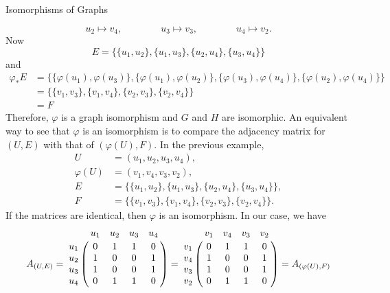 \documentclass[smaller,hyperref={CJKbookmarks=true}]{beamer}
\begin{document}
\begin{frame}{Isomorphisms of Graphs}
\begin{spacing}{1.05}
\[u_2\mapsto v_4,\qquad\qquad u_3\mapsto v_3,\qquad\qquad u_4\mapsto v_2.\]
Now
\[E=\big\{\{u_1,u_2\},\{u_1,u_3\},\{u_2,u_4\},\{u_3,u_4\}\big\}\]
and
\begin{equation*}
  \begin{split}
     \varphi_\ast E &=\big\{\{\varphi(u_1),\varphi(u_3)\},\{\varphi(u_1),\varphi(u_2)\},\{\varphi(u_3),\varphi(u_4)\},\{\varphi(u_2),\varphi(u_4)\}\big\} \\
       &=\big\{\{v_1,v_3\},\{v_1,v_4\},\{v_2,v_3\},\{v_2,v_4\}\big\} \\
       &=F
  \end{split}
\end{equation*}
Therefore, $\varphi$ is a graph isomorphism and $G$ and $H$ are isomorphic.
\newpage
An equivalent way to see that $\varphi$ is an isomorphism is to compare the adjacency matrix for $(U,E)$ with that of $(\varphi(U),F)$. In the previous example,
\begin{align*}
  U &=(u_1,u_2,u_3,u_4), \\
  \varphi(U) &=(v_1,v_4,v_3,v_2), \\
  E &=\big\{\{u_1,u_2\},\{u_1,u_3\},\{u_2,u_4\},\{u_3,u_4\}\big\}, \\
  F &=\big\{\{v_1,v_3\},\{v_1,v_4\},\{v_2,v_3\},\{v_2,v_4\}\big\}.
\end{align*}
If the matrices are identical, then $\varphi$ is an isomorphism. In our case, we have
\[A_{(U,E)}=\bordermatrix{
 & u_1 & u_2 & u_3 & u_4 \cr
u_1 & 0 & 1 & 1 & 0 \cr
u_2 & 1 & 0 & 0 & 1 \cr
u_3 & 1 & 0 & 0 & 1 \cr
u_4 & 0 & 1 & 1 & 0 \cr}=\bordermatrix{
& v_1 & v_4 & v_3 & v_2 \cr
v_1 & 0 & 1 & 1 & 0 \cr
v_4 & 1 & 0 & 0 & 1 \cr
v_3 & 1 & 0 & 0 & 1 \cr
v_2 & 0 & 1 & 1 & 0 \cr}=A_{(\varphi(U),F)}\]
\end{spacing}
\end{frame}
\end{document}
